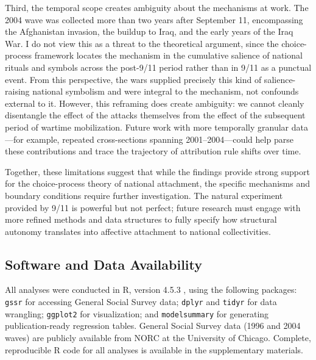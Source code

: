 \documentclass[12pt,letterpaper]{article}
\begin{document}
Third, the temporal scope creates ambiguity about the mechanisms at work. The 2004 wave was collected more than two years after September 11, encompassing the Afghanistan invasion, the buildup to Iraq, and the early years of the Iraq War. I do not view this as a threat to the theoretical argument, since the choice-process framework locates the mechanism in the cumulative salience of national rituals and symbols across the post-9/11 period rather than in 9/11 as a punctual event. From this perspective, the wars supplied precisely this kind of salience-raising national symbolism and were integral to the mechanism, not confounds external to it. However, this reframing does create ambiguity: we cannot cleanly disentangle the effect of the attacks themselves from the effect of the subsequent period of wartime mobilization. Future work with more temporally granular data---for example, repeated cross-sections spanning 2001--2004---could help parse these contributions and trace the trajectory of attribution rule shifts over time.

Together, these limitations suggest that while the findings provide strong support for the choice-process theory of national attachment, the specific mechanisms and boundary conditions require further investigation. The natural experiment provided by 9/11 is powerful but not perfect; future research must engage with more refined methods and data structures to fully specify how structural autonomy translates into affective attachment to national collectivities.

\subsection*{Software and Data Availability}

All analyses were conducted in R, version 4.5.3 \citep{rcoreteam2024language}, using the following packages: \texttt{gssr} \citep{healy2024gssr} for accessing General Social Survey data; \texttt{dplyr} and \texttt{tidyr} \citep{wickham2023dplyr, wickham2023tidyr} for data wrangling; \texttt{ggplot2} \citep{wickham2016ggplot2} for visualization; and \texttt{modelsummary} \citep{arel-bundock2024modelsummary} for generating publication-ready regression tables. General Social Survey data (1996 and 2004 waves) are publicly available from NORC at the University of Chicago. Complete, reproducible R code for all analyses is available in the supplementary materials.

\clearpage
 
\end{document}
